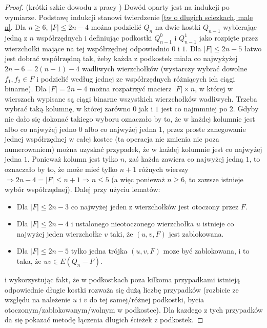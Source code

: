 \documentclass{pracamgr}
\begin{document}
   \begin{proof}
    (krótki szkic dowodu z pracy \cite{FG})\newline
    Dowód oparty jest na indukcji po wymiarze.
    Podstawę indukcji stanowi twierdzenie \ref{tw o dlugich sciezkach, male n}.%
    Dla $n\ge6$, $|F|\le 2n-4$ można podzielić $Q_n$ na dwie kostki $Q_{n-1}$ wybierając jedną z $n$ współrzędnych 
    i definiując podkostki $Q^0_{n-1}$ i $Q^1_{n-1}$ jako rozpięte przez wierzchołki mające na tej współrzędnej odpowiednio $0$ i $1$.
    Dla $|F|\le 2n-5$ łatwo jest dobrać współrzędną tak, żeby każda z podkostek miała co najwyżyżej $2n-6=2(n-1)-4$ wadliwych wierzchołków
    (wystarczy wybrać dowolne $f_1,f_2\in F$ i podzielić według jednej ze współrzędnych różniących ich ciągi binarne).
    Dla $|F|=2n-4$ można rozpatrzyć macierz $|F|\times n$, w której w wierszach wypisane są ciągi binarne wszystkich wierzchołków wadliwych.
    Trzeba wybrać taką kolumnę, w której zarówno $0$ jak i $1$ jest co najmmniej po 2. Gdyby nie dało się dokonać takiego wyboru oznaczało by to, że
    w każdej kolumnie jest albo co najwyżej jedno $0$ albo co najwyżej jedna $1$, przez proste zanegowanie jednej współrzędnej w całej kostce
    (ta operacja nie zmienia nic poza numerowaniem) można uzyskać przypadek, że w każdej kolumnie jest co najwyżej jedna $1$. 
    Ponieważ kolumn jest tylko $n$, zaś każda zawiera co najwyżej jedną $1$, to oznaczało by to, że może mieć tylko $n+1$ różnych wierszy
    $\Rightarrow 2n-4=|F|\le n+1\Rightarrow n\le5$ (a więc ponieważ $n\ge 6$, to zawsze istnieje wybór współrzędnej).\newline
    Dalej przy użyciu lematów:
    \begin{itemize}
     \item Dla $|F|\le 2n-3$ co najwyżej jeden z wierzchołków jest otoczony przez $F$.
     \item Dla $|F|\le 2n-4$ i ustalonego nieotoczonego wierzchołka $u$ istnieje co najwyżej jeden wierzchołke $v$ taki, że $(u,v,F)$ jest zablokowana.
     \item Dla $|F|\le 2n-5$ tylko jedna trójka $(u,v,F)$ moze być zablokowana, i to taka, że $uv\in E(Q_n-F)$.
    \end{itemize}
    i wykorzystując fakt, że w podkostkach poza kilkoma przypadkami istnieją odpowiednie długie kostki rozważa się dużą liczbę przypadków
    (rozbicie ze względu na należenie $u$ i $v$ do tej samej/różnej podkostki, bycia otoczonym/zablokowanym/wolnym w podkostce).
    Dla kazdego z tych przypadków da się pokazać metodę łączenia długich ścieżek z podkostek.
   \end{proof}
\end{document}
